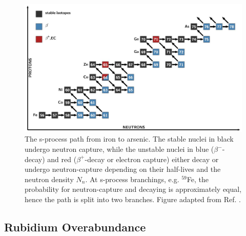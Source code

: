 \begin{figure}[t]
\centering
\includegraphics[width=6.5in]{Chapter-1/figs/sProcess_path.jpg}
\caption{\label{fig:sProcess_path}The s-process path from iron to arsenic. The stable nuclei in black undergo neutron capture, while the unstable nuclei in blue ($\beta^{-}$-decay) and red ($\beta^{+}$-decay or electron capture) either decay or undergo neutron-capture depending on their half-lives and the neutron density $N_{n}$. At s-process branchings, e.g. $^{59}$Fe, the probability for neutron-capture and decaying is approximately equal, hence the path is split into two branches. Figure adapted from Ref. \cite{Reifarth2014}.}
\end{figure}




\subsection{Rubidium Overabundance} \label{subsec:Rb_Overabundance}



